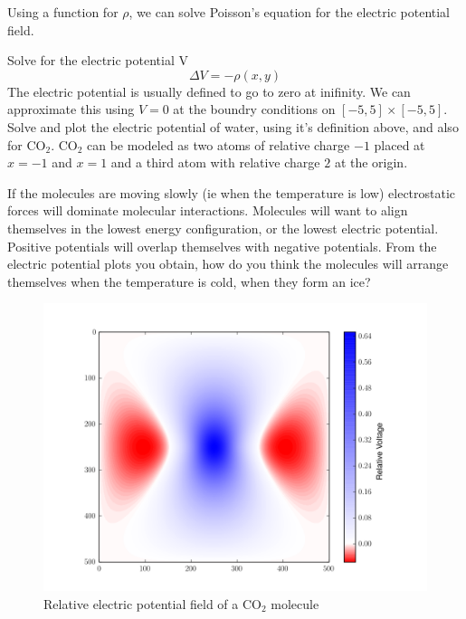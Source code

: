 Using a function for $\rho$, we can solve Poisson's equation for the electric potential field.
\begin{problem}
Solve for the electric potential V
\[
		\Delta V = -\rho(x,y) 
\]
The electric potential is usually defined to go to zero at inifinity.
We can approximate this using $V=0$ at the boundry conditions on $[-5,5]\times [-5,5]$.
Solve and plot the electric potential of water, using it's definition above, and also for CO$_2$.
CO$_2$ can be modeled as two atoms of relative charge $-1$ placed at $x=-1$ and $x=1$ and a third atom with relative charge $2$ at the origin. 

If the molecules are moving slowly (ie when the temperature is low) electrostatic forces will dominate molecular interactions. 
Molecules will want to align themselves in the lowest energy configuration, or the lowest electric potential. 
Positive potentials will overlap themselves with negative potentials. 
From the electric potential plots you obtain, how do you think the molecules will arrange themselves when the temperature is cold, when they form an ice?

\end{problem}
\begin{figure}[ht]
\centering
\includegraphics[width=12cm]{co2V.png}
\caption{Relative electric potential field of a CO$_2$ molecule}
\label{figure4}
\end{figure}
